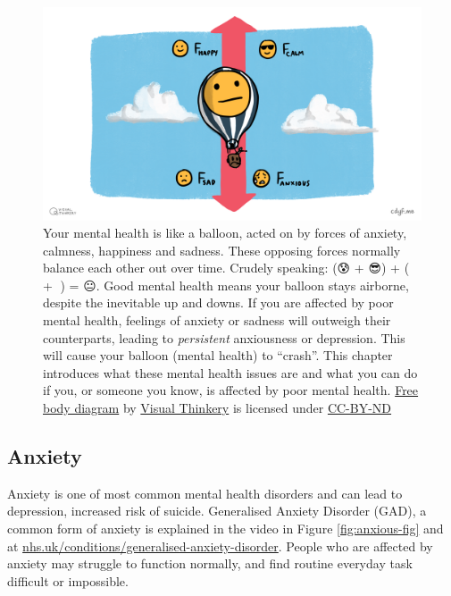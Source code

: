 \documentclass[
]{book}
\begin{document}
\begin{figure}

{\centering \includegraphics[width=0.99\linewidth]{images/Free body diagram} 

}

\caption{Your mental health is like a balloon, acted on by forces of anxiety, calmness, happiness and sadness. These opposing forces normally balance each other out over time. Crudely speaking: (😰 + 😎) + (🙂 + 🙁) = 😐. Good mental health means your balloon stays airborne, despite the inevitable up and downs. If you are affected by poor mental health, feelings of anxiety or sadness will outweigh their counterparts, leading to \emph{persistent} anxiousness or depression. This will cause your balloon (mental health) to ``crash''. This chapter introduces what these mental health issues are and what you can do if you, or someone you know, is affected by poor mental health. \href{https://en.wikipedia.org/wiki/Free_body_diagram}{Free body diagram} by \href{https://visualthinkery.com}{Visual Thinkery} is licensed under \href{https://creativecommons.org/licenses/by-nd/4.0/}{CC-BY-ND} 🎈}\label{fig:free-body-fig}
\end{figure}



\hypertarget{anxiety}{%
\subsection{Anxiety}\label{anxiety}}

Anxiety is one of most common mental health disorders and can lead to depression, increased risk of suicide. Generalised Anxiety Disorder (GAD), a common form of anxiety is explained in the video in Figure \ref{fig:anxious-fig} and at \href{https://www.nhs.uk/conditions/generalised-anxiety-disorder/}{nhs.uk/conditions/generalised-anxiety-disorder}. People who are affected by anxiety may struggle to function normally, and find routine everyday task difficult or impossible.
\end{document}
